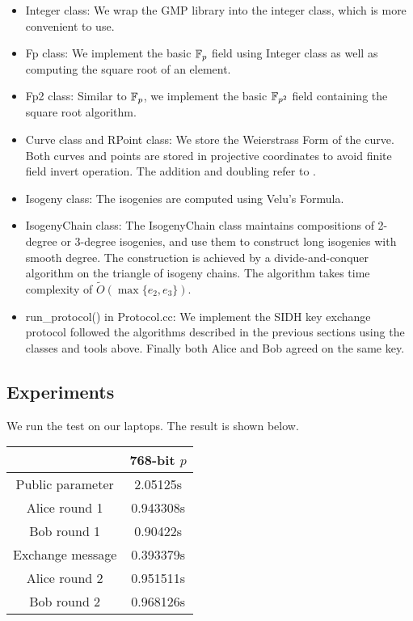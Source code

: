 \begin{itemize}
    \item Integer class: We wrap the GMP library into the integer class, which is more convenient to use.
    \item Fp class: We implement the basic $\mathbb{F}_p$ field using Integer class as well as computing the square root of an element.
    \item Fp2 class: Similar to $\mathbb{F}_p$, we implement the basic $\mathbb{F}_{p^2}$ field containing the square root algorithm.
    \item Curve class and RPoint class: We store the Weierstrass Form of the curve. Both curves and points are stored in projective coordinates to avoid finite field invert operation. The addition and doubling refer to \cite{EFD}.
    \item Isogeny class: The isogenies are computed using Velu's Formula.
    \item IsogenyChain class: The IsogenyChain class maintains compositions of 2-degree or 3-degree isogenies, and use them to construct long isogenies with smooth degree. The construction is achieved by a divide-and-conquer algorithm \cite{PQCRYPTO:JaoDeFo11} on the triangle of isogeny chains. The algorithm takes time complexity of $\tilde{O}(\max\{e_2,e_3\})$.
    \item run\_protocol() in Protocol.cc: We implement the SIDH key exchange protocol followed the algorithms described in the previous sections using the classes and tools above. Finally both Alice and Bob agreed on the same key.
\end{itemize}

\subsection{Experiments}

We run the test on our laptops. The result is shown below.
\begin{table}[H]
    \centering
    \begin{tabular}{|c|c|}
    \hline
                     & 768-bit $p$  \\ \hline
    Public parameter & 2.05125s  \\ \hline
    Alice round 1    & 0.943308s \\ \hline
    Bob round 1      & 0.90422s  \\ \hline
    Exchange message & 0.393379s \\ \hline
    Alice round 2    & 0.951511s \\ \hline
    Bob round 2      & 0.968126s \\ \hline
    \end{tabular}
    \end{table}
